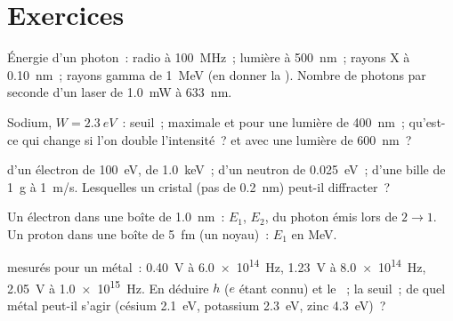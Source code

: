 \section{Exercices}

\begin{exercise}[$\star$]\label{exo:b1:quantum-introduction:1}
Énergie d'un photon~: radio à \qty{100}{MHz}~; lumière à \qty{500}{nm}~;
rayons X à \qty{0.10}{nm}~; rayons gamma de \qty{1}{MeV} (en donner la
). Nombre de photons par seconde d'un laser de \qty{1.0}{mW} à
\qty{633}{nm}.
\end{exercise}

\begin{exercise}[$\star$]\label{exo:b1:quantum-introduction:2}
Sodium, $W = \qty{2.3}{eV}$~:  seuil~; 
maximale et  pour une lumière de \qty{400}{nm}~; qu'est-ce
qui change si l'on double l'intensité~? et avec une lumière de \qty{600}{nm}~?
\end{exercise}

\begin{exercise}[$\star$]\label{exo:b1:quantum-introduction:3}
 d'un électron de \qty{100}{eV}, de \qty{1.0}{keV}~;
d'un neutron de \qty{0.025}{eV}~; d'une bille de \qty{1}{g} à \qty{1}{m/s}.
Lesquelles un cristal (pas de \qty{0.2}{nm}) peut-il diffracter~?
\end{exercise}

\begin{exercise}[$\star$]\label{exo:b1:quantum-introduction:4}
Un électron dans une boîte de \qty{1.0}{nm}~: $E_1$, $E_2$, 
du photon émis lors de $2 \to 1$. Un proton dans une boîte de \qty{5}{fm}
(un noyau)~: $E_1$ en \unit{MeV}.
\end{exercise}

\begin{exercise}[$\star\star$]\label{exo:b1:quantum-introduction:5}
 mesurés pour un métal~: \qty{0.40}{V} à
\qty{6.0e14}{Hz}, \qty{1.23}{V} à \qty{8.0e14}{Hz}, \qty{2.05}{V} à
\qty{1.0e15}{Hz}. En déduire $h$ ($e$ étant connu) et le ~; la  seuil~; de quel métal peut-il s'agir
(césium \qty{2.1}{eV}, potassium \qty{2.3}{eV}, zinc \qty{4.3}{eV})~?
\end{exercise}

